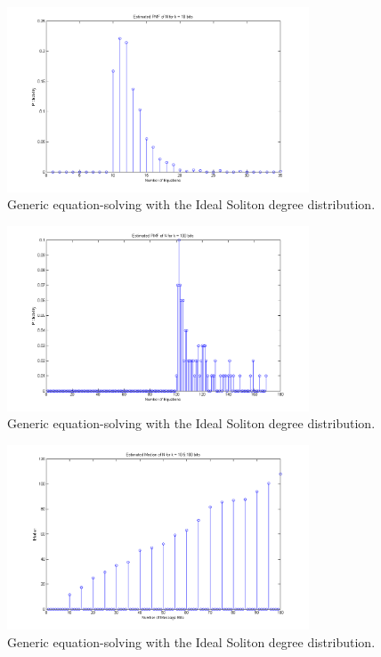 \documentclass[11pt]{article}
\begin{document}
\begin{enumerate}
    \begin{figure}[H]
        \begin{center}
            \includegraphics[width = 0.8\textwidth]{figure_1b_k10_ideal.png}
            \caption{Generic equation-solving with the Ideal Soliton degree distribution.}
        \end{center}
    \end{figure}

    \begin{figure}[H]
        \begin{center}
            \includegraphics[width = 0.8\textwidth]{figure_1b_k100_ideal.png}
            \caption{Generic equation-solving with the Ideal Soliton degree distribution.}
        \end{center}
    \end{figure}

    \begin{figure}[H]
        \begin{center}
            \includegraphics[width = 0.8\textwidth]{figure_1b_median_ideal.png}
            \caption{Generic equation-solving with the Ideal Soliton degree distribution.}
        \end{center}
    \end{figure}


\end{enumerate}
\end{document}
